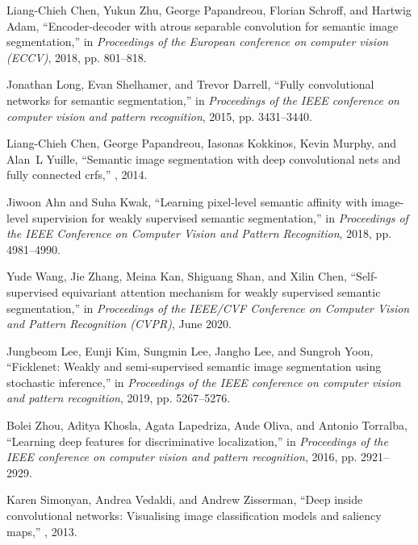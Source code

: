 \documentclass{article}
\begin{document}

\begin{thebibliography}{10}

Liang-Chieh Chen, Yukun Zhu, George Papandreou, Florian Schroff, and Hartwig
  Adam,
\newblock ``Encoder-decoder with atrous separable convolution for semantic
  image segmentation,''
\newblock in {\em Proceedings of the European conference on computer vision
  (ECCV)}, 2018, pp. 801--818.

Jonathan Long, Evan Shelhamer, and Trevor Darrell,
\newblock ``Fully convolutional networks for semantic segmentation,''
\newblock in {\em Proceedings of the IEEE conference on computer vision and
  pattern recognition}, 2015, pp. 3431--3440.

Liang-Chieh Chen, George Papandreou, Iasonas Kokkinos, Kevin Murphy, and Alan~L
  Yuille,
\newblock ``Semantic image segmentation with deep convolutional nets and fully
  connected crfs,''
, 2014.

Jiwoon Ahn and Suha Kwak,
\newblock ``Learning pixel-level semantic affinity with image-level supervision
  for weakly supervised semantic segmentation,''
\newblock in {\em Proceedings of the IEEE Conference on Computer Vision and
  Pattern Recognition}, 2018, pp. 4981--4990.

Yude Wang, Jie Zhang, Meina Kan, Shiguang Shan, and Xilin Chen,
\newblock ``Self-supervised equivariant attention mechanism for weakly
  supervised semantic segmentation,''
\newblock in {\em Proceedings of the IEEE/CVF Conference on Computer Vision and
  Pattern Recognition (CVPR)}, June 2020.

Jungbeom Lee, Eunji Kim, Sungmin Lee, Jangho Lee, and Sungroh Yoon,
\newblock ``Ficklenet: Weakly and semi-supervised semantic image segmentation
  using stochastic inference,''
\newblock in {\em Proceedings of the IEEE conference on computer vision and
  pattern recognition}, 2019, pp. 5267--5276.

Bolei Zhou, Aditya Khosla, Agata Lapedriza, Aude Oliva, and Antonio Torralba,
\newblock ``Learning deep features for discriminative localization,''
\newblock in {\em Proceedings of the IEEE conference on computer vision and
  pattern recognition}, 2016, pp. 2921--2929.

Karen Simonyan, Andrea Vedaldi, and Andrew Zisserman,
\newblock ``Deep inside convolutional networks: Visualising image
  classification models and saliency maps,''
, 2013.


\end{thebibliography}
\end{document}
